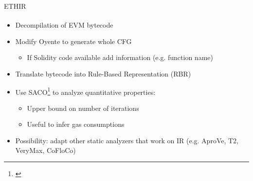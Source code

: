 \begin{frame}{ETHIR}
\framesubtitle{\cite{bib:ETHIR}}
    \begin{itemize}
        \item Decompilation of EVM bytecode
        \item Modify Oyente to generate whole CFG
        \begin{itemize}
            \item If Solidity code available add information (e.g. function
            name)
        \end{itemize}
        \item Translate bytecode into Rule-Based Representation (RBR)
        \item Use SACO\footnote{\cite{bib:SACO}} to analyze quantitative properties:
        \begin{itemize}
            \item Upper bound on number of iterations
            \item Useful to infer gas consumptions
        \end{itemize}
        \item Possibility: adapt other static analyzers that work
        on IR (e.g. AproVe, T2, VeryMax, CoFloCo)
    \end{itemize}
\end{frame}
